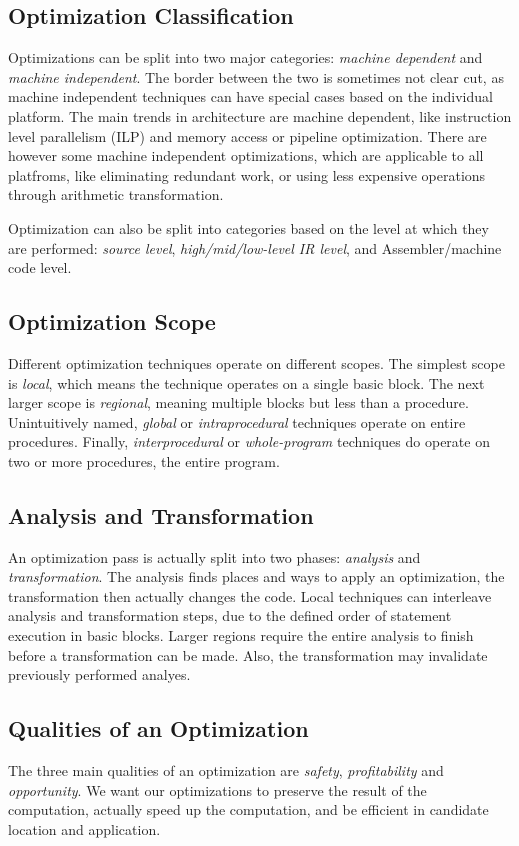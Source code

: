 \documentclass{article}
\begin{document}
\subsection{Optimization Classification}
Optimizations can be split into two major categories: \emph{machine dependent} and \emph{machine independent}.
The border between the two is sometimes not clear cut, as machine independent techniques can have special cases based on the individual platform.
The main trends in architecture are machine dependent, like instruction level parallelism (ILP) and memory access or pipeline optimization.
There are however some machine independent optimizations, which are applicable to all platfroms, like eliminating redundant work, or using less expensive operations through arithmetic transformation.

Optimization can also be split into categories based on the level at which they are performed: \emph{source level}, \emph{high/mid/low-level IR level}, and Assembler/machine code level.

\subsection{Optimization Scope}
Different optimization techniques operate on different scopes.
The simplest scope is \emph{local}, which means the technique operates on a single basic block.
The next larger scope is \emph{regional}, meaning multiple blocks but less than a procedure.
Unintuitively named, \emph{global} or \emph{intraprocedural} techniques operate on entire procedures.
Finally, \emph{interprocedural} or \emph{whole-program} techniques do operate on two or more procedures, the entire program.

\subsection{Analysis and Transformation}
An optimization pass is actually split into two phases: \emph{analysis} and \emph{transformation}.
The analysis finds places and ways to apply an optimization, the transformation then actually changes the code.
Local techniques can interleave analysis and transformation steps, due to the defined order of statement execution in basic blocks.
Larger regions require the entire analysis to finish before a transformation can be made.
Also, the transformation may invalidate previously performed analyes.

\subsection{Qualities of an Optimization}
The three main qualities of an optimization are \emph{safety}, \emph{profitability} and \emph{opportunity}.
We want our optimizations to preserve the result of the computation, actually speed up the computation, and be efficient in candidate location and application.
\end{document}
